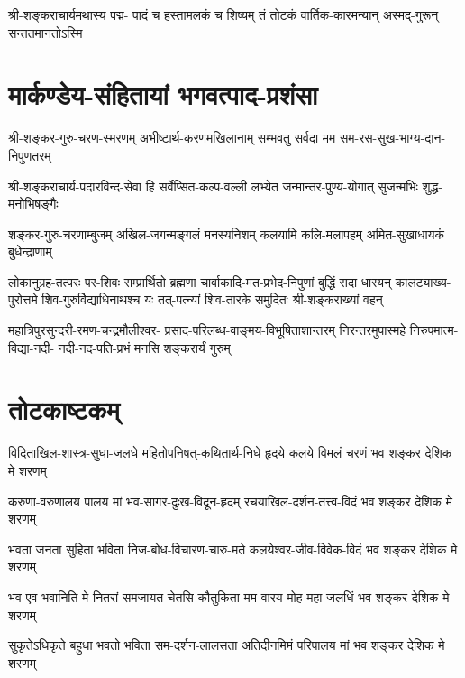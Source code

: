 \fourlineindentedshloka
{श्री-शङ्कराचार्यमथास्य पद्म-}
{पादं च हस्तामलकं च शिष्यम्}
{तं तोटकं वार्तिक-कारमन्यान्}
{अस्मद्-गुरून् सन्ततमानतोऽस्मि}



\section{मार्कण्डेय-संहितायां भगवत्पाद-प्रशंसा}

\twolineshloka
{श्री-शङ्कर-गुरु-चरण-स्मरणम् अभीष्टार्थ-करणमखिलानाम्}
{सम्भवतु सर्वदा मम सम-रस-सुख-भाग्य-दान-निपुणतरम्}

\twolineshloka
{श्री-शङ्कराचार्य-पदारविन्द-सेवा हि सर्वेप्सित-कल्प-वल्ली}
{लभ्येत जन्मान्तर-पुण्य-योगात् सुजन्मभिः शुद्ध-मनोभिषङ्गैः}

\twolineshloka
{शङ्कर-गुरु-चरणाम्बुजम् अखिल-जगन्मङ्गलं मनस्यनिशम्}
{कलयामि कलि-मलापहम् अमित-सुखाधायकं बुधेन्द्राणाम्}

\fourlineindentedshloka
{लोकानुग्रह-तत्परः पर-शिवः सम्प्रार्थितो ब्रह्मणा}
{चार्वाकादि-मत-प्रभेद-निपुणां बुद्धिं सदा धारयन्}
{कालट्याख्य-पुरोत्तमे शिव-गुरुर्विद्याधिनाथश्च यः}
{तत्-पत्न्यां शिव-तारके समुदितः श्री-शङ्कराख्यां वहन्}

\fourlineindentedshloka
{महात्रिपुरसुन्दरी-रमण-चन्द्रमौलीश्वर-}
{प्रसाद-परिलब्ध-वाङ्मय-विभूषिताशान्तरम्}
{निरन्तरमुपास्महे निरुपमात्म-विद्या-नदी-}
{नदी-नद-पति-प्रभं मनसि शङ्करार्यं गुरुम्}


\section{तोटकाष्टकम्}

\twolineshloka
{विदिताखिल-शास्त्र-सुधा-जलधे महितोपनिषत्-कथितार्थ-निधे}
{हृदये कलये विमलं चरणं भव शङ्कर देशिक मे शरणम्}

\twolineshloka
{करुणा-वरुणालय पालय मां भव-सागर-दुःख-विदून-हृदम्}
{रचयाखिल-दर्शन-तत्त्व-विदं भव शङ्कर देशिक मे शरणम्}

\twolineshloka
{भवता जनता सुहिता भविता निज-बोध-विचारण-चारु-मते}
{कलयेश्वर-जीव-विवेक-विदं भव शङ्कर देशिक मे शरणम्}

\twolineshloka
{भव एव भवानिति मे नितरां समजायत चेतसि कौतुकिता}
{मम वारय मोह-महा-जलधिं भव शङ्कर देशिक मे शरणम्}

\twolineshloka
{सुकृतेऽधिकृते बहुधा भवतो भविता सम-दर्शन-लालसता}
{अतिदीनमिमं परिपालय मां भव शङ्कर देशिक मे शरणम्}


